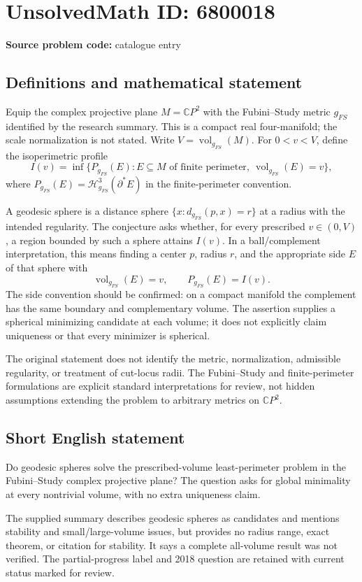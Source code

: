 \documentclass[11pt]{article}
\newcommand{\C}{\mathbb{C}}
\begin{document}
\section*{UnsolvedMath ID: 6800018}
\textbf{Source problem code:} catalogue entry
\subsection{Definitions and mathematical statement}
Equip the complex projective plane $M=\C P^2$ with the Fubini--Study metric $g_{FS}$ identified by the research summary. This is a compact real four-manifold; the scale normalization is not stated. Write $V=\operatorname{vol}_{g_{FS}}(M)$. For $0<v<V$, define the isoperimetric profile
\[
 I(v)=\inf\{P_{g_{FS}}(E):E\subseteq M\text{ of finite perimeter},
                         \ \operatorname{vol}_{g_{FS}}(E)=v\},
\]
where $P_{g_{FS}}(E)=\mathcal H^3_{g_{FS}}(\partial^*E)$ in the finite-perimeter convention.

A geodesic sphere is a distance sphere $\{x:d_{g_{FS}}(p,x)=r\}$ at a radius with the intended regularity. The conjecture asks whether, for every prescribed $v\in(0,V)$, a region bounded by such a sphere attains $I(v)$. In a ball/complement interpretation, this means finding a center $p$, radius $r$, and the appropriate side $E$ of that sphere with
\[
 \operatorname{vol}_{g_{FS}}(E)=v,\qquad
 P_{g_{FS}}(E)=I(v).
\]
The side convention should be confirmed: on a compact manifold the complement has the same boundary and complementary volume. The assertion supplies a spherical minimizing candidate at each volume; it does not explicitly claim uniqueness or that every minimizer is spherical.

The original statement does not identify the metric, normalization, admissible regularity, or treatment of cut-locus radii. The Fubini--Study and finite-perimeter formulations are explicit standard interpretations for review, not hidden assumptions extending the problem to arbitrary metrics on $\C P^2$.
\subsection{Short English statement}
Do geodesic spheres solve the prescribed-volume least-perimeter problem in the Fubini--Study complex projective plane? The question asks for global minimality at every nontrivial volume, with no extra uniqueness claim.

The supplied summary describes geodesic spheres as candidates and mentions stability and small/large-volume issues, but provides no radius range, exact theorem, or citation for stability. It says a complete all-volume result was not verified. The partial-progress label and 2018 question are retained with current status marked for review.
\end{document}
